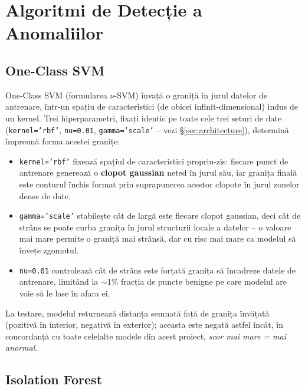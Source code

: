 \section{Algoritmi de Detecție a Anomaliilor}
\label{sec:paradigms}

\subsection{One-Class SVM}

One-Class SVM (formularea $\nu$-SVM) învață o graniță în jurul datelor de antrenare, într-un spațiu de caracteristici (de obicei infinit-dimensional) indus de un kernel. Trei hiperparametri, fixați identic pe toate cele trei seturi de date (\texttt{kernel='rbf'}, \texttt{nu=0.01}, \texttt{gamma='scale'} -- vezi \S\ref{sec:architecture}), determină împreună forma acestei granițe:

\begin{itemize}
  \item \texttt{kernel='rbf'} fixează spațiul de caracteristici propriu-zis: fiecare punct de antrenare generează o \textbf{clopot gaussian} neted în jurul său, iar granița finală este conturul închis format prin suprapunerea acestor clopote în jurul zonelor dense de date.
  \item \texttt{gamma='scale'} stabilește cât de largă este fiecare clopot gaussian, deci cât de strâns se poate curba granița în jurul structurii locale a datelor -- o valoare mai mare permite o graniță mai strânsă, dar cu risc mai mare ca modelul să învețe zgomotul.
  \item \texttt{nu=0.01} controlează cât de strâns este forțată granița să încadreze datele de antrenare, limitând la $\sim$1\% fracția de puncte benigne pe care modelul are voie să le lase în afara ei.
\end{itemize}

La testare, modelul returnează distanța semnată față de granița învățată (pozitivă în interior, negativă în exterior); aceasta este negată astfel încât, în concordanță cu toate celelalte modele din acest proiect, \emph{scor mai mare = mai anormal}.

\subsection{Isolation Forest}

